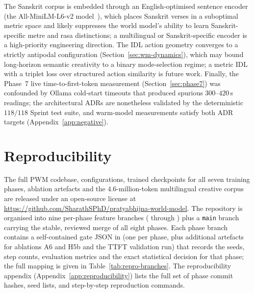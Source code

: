 \documentclass[journal,onecolumn,11pt]{IEEEtran}
\begin{document}
The Sanskrit corpus is embedded through an English-optimised sentence
encoder (the All-MiniLM-L6-v2 model~\cite{reimers2019sentence}), which
places Sanskrit verses in a
suboptimal metric space and likely suppresses the world model's ability to
learn Sanskrit-specific metre and rasa distinctions; a multilingual or
Sanskrit-specific encoder is a high-priority engineering direction.
The IDL action geometry converges to a strictly antipodal configuration
(Section~\ref{sec:wm-dynamics}), which may bound long-horizon semantic
creativity to a binary mode-selection regime; a metric IDL with a triplet
loss over structured action similarity is future work.
Finally, the Phase~7 live time-to-first-token measurement
(Section~\ref{sec:phase7}) was confounded by Ollama cold-start timeouts
that produced spurious $300$--$420$\,s readings; the architectural ADRs are
nonetheless validated by the deterministic $118/118$ Sprint test suite, and
warm-model measurements satisfy both ADR targets
(Appendix~\ref{app:negative}).

\section{Reproducibility}\label{sec:reproducibility}

The full PWM codebase, configurations, trained checkpoints for all seven
training phases, ablation artefacts and the $4.6$-million-token multilingual
creative corpus are released under an open-source license at
\url{https://github.com/SharathSPhD/pratyabhijna-world-model}.
The repository is organised into nine per-phase feature branches
( through ) plus a
\texttt{main} branch carrying the stable, reviewed merge of all eight
phases.
Each phase branch contains a self-contained gate JSON in
 (one per phase, plus additional artefacts for
ablations A6 and H5b and the TTFT validation run) that records the seeds,
step counts, evaluation metrics and the exact statistical decision for
that phase; the full mapping is given in Table~\ref{tab:repro-branches}.
The reproducibility appendix (Appendix~\ref{app:reproducibility}) lists
the full set of phase commit hashes, seed lists, and step-by-step
reproduction commands.
\end{document}
